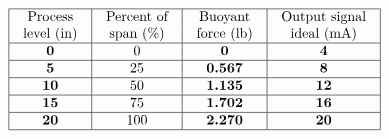 

$$\vbox{\offinterlineskip
\halign{\strut
\vrule \quad\hfil # \ \hfil & 
\vrule \quad\hfil # \ \hfil & 
\vrule \quad\hfil # \ \hfil & 
\vrule \quad\hfil # \ \hfil \vrule \cr
\noalign{\hrule}
%
Process & Percent of & Buoyant & Output signal \cr
%
level (in) & span (\%) & force (lb) & ideal (mA) \cr
%
\noalign{\hrule}
%
{\bf 0} & 0 & {\bf 0} & {\bf 4} \cr
%
\noalign{\hrule}
%
{\bf 5} & 25 & {\bf 0.567} & {\bf 8} \cr
%
\noalign{\hrule}
%
{\bf 10} & 50 & {\bf 1.135} & {\bf 12} \cr
%
\noalign{\hrule}
%
{\bf 15} & 75 & {\bf 1.702} & {\bf 16} \cr
%
\noalign{\hrule}
%
{\bf 20} & 100 & {\bf 2.270} & {\bf 20} \cr
%
\noalign{\hrule}
} %
}$$ %











